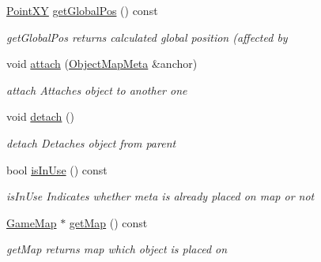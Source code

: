 \begin{DoxyCompactItemize}
\hyperlink{classPointXY}{Point\+X\+Y} \hyperlink{classObjectMapMeta_a66b92b6e542b4170a3a2c830d95807d8}{get\+Global\+Pos} () const 
\begin{DoxyCompactList}\small\item\em get\+Global\+Pos returns calculated global position (affected by \end{DoxyCompactList}\item 
void \hyperlink{classObjectMapMeta_ae4a20414fe790ad32542294d18efb931}{attach} (\hyperlink{classObjectMapMeta}{Object\+Map\+Meta} \&anchor)
\begin{DoxyCompactList}\small\item\em attach Attaches object to another one \end{DoxyCompactList}\item 
\hypertarget{classObjectMapMeta_ab73aa1e8a6cb41fcedc94ebf904a5c41}{}void \hyperlink{classObjectMapMeta_ab73aa1e8a6cb41fcedc94ebf904a5c41}{detach} ()\label{classObjectMapMeta_ab73aa1e8a6cb41fcedc94ebf904a5c41}

\begin{DoxyCompactList}\small\item\em detach Detaches object from parent \end{DoxyCompactList}\item 
bool \hyperlink{classObjectMapMeta_ac0ba6c1b3c98a0b015e60da4575411cb}{is\+In\+Use} () const 
\begin{DoxyCompactList}\small\item\em is\+In\+Use Indicates whether meta is already placed on map or not \end{DoxyCompactList}\item 
\hyperlink{classGameMap}{Game\+Map} $\ast$ \hyperlink{classObjectMapMeta_ae9a94a068918c364af21c8e8dc515f0a}{get\+Map} () const 
\begin{DoxyCompactList}\small\item\em get\+Map returns map which object is placed on \end{DoxyCompactList}\end{DoxyCompactItemize}
